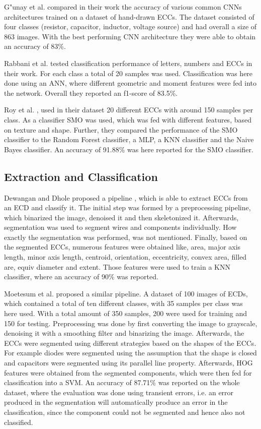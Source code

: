 G"unay et al. \cite{ecd_basecnn} compared in their work the accuracy of various common \acp{CNN} architectures trained on a dataset of hand-drawn \acp{ECC}.
The dataset consisted of four classes (resistor, capacitor, inductor, voltage source) and had overall a size of 863 images.
With the best performing \ac{CNN} architecture they were able to obtain an accuracy of 83\%.

Rabbani et al. \cite{ecd_anngeo} tested classification performance of letters, numbers and \acp{ECC} in their work.
For each class a total of 20 samples was used.
Classification was here done using an \ac{ANN}, where different geometric and moment features were fed into the network.
Overall they reported an f1-score of 83.5\%.

Roy et al. \cite{ecd_texturesmo}, used in their dataset 20 different \acp{ECC} with around 150 samples per class.
As a classifier \ac{SMO} was used, which was fed with different features, based on texture and shape.
Further, they compared the performance of the \ac{SMO} classifier to the Random Forest classifier, a \ac{MLP}, a \ac{KNN} classifier and the Naive Bayes classifier.
An accuracy of 91.88\% was here reported for the \ac{SMO} classifier.


\subsection{Extraction and Classification}

Dewangan and Dhole \cite{ecd_knn_recog} proposed a pipeline , which is able to extract \acp{ECC} from an \ac{ECD} and classify it.
The initial step was formed by a preprocessing pipeline, which binarized the image, denoised it and then skeletonized it.
Afterwards, segmentation was used to segment wires and components individually.
How exactly the segmentation was performed, was not mentioned.
Finally, based on the segmented \acp{ECC}, numerous features were obtained like, area, major axis length, minor axis length, centroid, orientation, eccentricity, convex area, filled are, equiv diameter and extent.
Those features were used to train a \ac{KNN} classifier, where an accuracy of 90\% was reported.

Moetesum et al. \cite{ecd_seghogsvm} proposed a similar pipeline.
A dataset of 100 images of \acp{ECD}, which contained a total of ten different classes, with 35 samples per class was here used.
With a total amount of 350 samples, 200 were used for training and 150 for testing.
Preprocessing was done by first converting the image to grayscale, denoising it with a smoothing filter and binarizing the image.
Afterwards, the \acp{ECC} were segmented using different strategies based on the shapes of the \acp{ECC}.
For example diodes were segmented using the assumption that the shape is closed and capacitors were segmented using its parallel line property.
Afterwards, \ac{HOG} features were obtained from the segmented components, which were then fed for classification into a \ac{SVM}.
An accuracy of 87.71\% was reported on the whole dataset, where the evaluation was done using transient errors, i.e. an error produced in the segmentation will automatically produce an error in the classification, since the component could not be segmented and hence also not classified.

